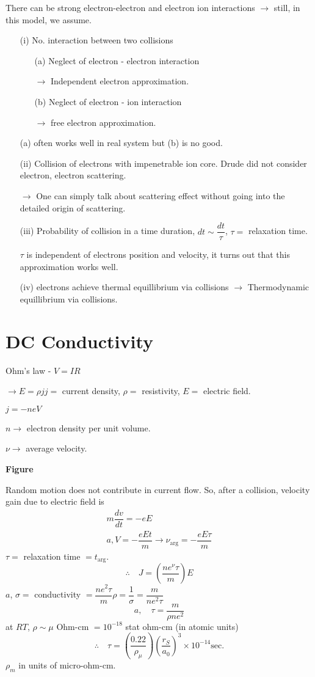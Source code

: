 There can be strong electron-electron and electron ion interactions $\to$ still, in this model, we assume.
\begin{itemize}
\item[(i)] No. interaction between two collisions
\begin{itemize}
\item[(a)] Neglect of electron - electron interaction

$\to$ Independent electron approximation.

\item[(b)] Neglect of electron - ion interaction

$\to$ free electron approximation.
\end{itemize}
(a) often works well in real system but (b) is no good.

\item[(ii)] Collision of electrons with impenetrable ion core. Drude did not consider electron, electron scattering.

$\to$ One can simply talk about scattering effect without going into the detailed origin of scattering.

\item[(iii)] Probability of collision in a time duration, $dt\sim \dfrac{dt}{\tau}$, $\tau=$ relaxation time.

$\tau$ is independent of electrons position and velocity, it turns out that this approximation works well.

\item[(iv)] electrons achieve thermal equillibrium via collisions $\to$ Thermodynamic equillibrium via collisions.
\end{itemize}

\section*{DC Conductivity}

Ohm's law - $V=IR$

$\to E=\rho j$\quad $j=$ current density, $\rho=$ resistivity, $E=$ electric field.

$j=-neV$

$n\to$ electron density per unit volume.

$\nu\to$ average velocity.
\begin{center}
{\bf Figure}
\end{center}

Random motion does not contribute in current flow. So, after a collision, velocity gain due to electric field is
\begin{gather*}
m\dfrac{dv}{dt}=-eE\\
a, V=-\dfrac{eEt}{m}\to \nu_{\text{arg}}=-\dfrac{eE\tau}{m}
\end{gather*}
$\tau=$ relaxation time $=t_{\text{arg}}$.
$$
\therefore\quad J=\left(\dfrac{ne^{\nu}\tau}{m}\right)E
$$
$a$, $\sigma=$ conductivity $=\dfrac{ne^{2}\tau}{m}$\quad $\rho=\dfrac{1}{\sigma}=\dfrac{m}{ne^{2}\tau}$
$$
a,\quad \tau = \dfrac{m}{\rho ne^{2}}
$$
at $RT$, $\rho\sim\mu$ Ohm-cm $=10^{-18}$ stat ohm-cm (in atomic units)
$$
\therefore\quad \tau=\left(\dfrac{0.22}{\rho_{\mu}}\right)\left(\dfrac{r_{S}}{a_{0}}\right)^{3}\times 10^{-14}\text{sec.}
$$
$\rho_{m}$ in units of micro-ohm-cm.

